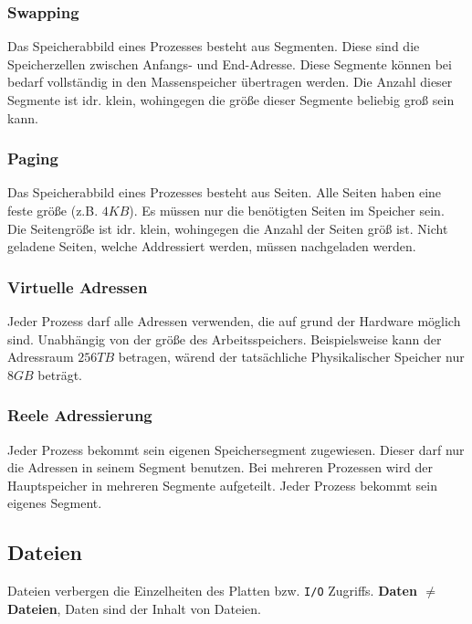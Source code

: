 \subsubsection{Swapping}

Das Speicherabbild eines Prozesses besteht aus Segmenten. Diese sind die
Speicherzellen zwischen Anfangs- und End-Adresse. Diese Segmente können bei
bedarf vollständig in den Massenspeicher übertragen werden. Die Anzahl dieser
Segmente ist idr. klein, wohingegen die größe dieser Segmente beliebig groß
sein kann.

\subsubsection{Paging}

Das Speicherabbild eines Prozesses besteht aus Seiten. Alle Seiten haben eine
feste größe (z.B. $4KB$). Es müssen nur die benötigten Seiten im Speicher sein.
Die Seitengröße ist idr. klein, wohingegen die Anzahl der Seiten größ ist.
Nicht geladene Seiten, welche Addressiert werden, müssen nachgeladen werden.

\subsubsection{Virtuelle Adressen}

Jeder Prozess darf alle Adressen verwenden, die auf grund der Hardware möglich
sind. Unabhängig von der größe des Arbeitsspeichers. Beispielsweise kann der
Adressraum $256TB$ betragen, wärend der tatsächliche Physikalischer Speicher
nur $8GB$ beträgt.

\subsubsection{Reele Adressierung}

Jeder Prozess bekommt sein eigenen Speichersegment zugewiesen. Dieser darf nur
die Adressen in seinem Segment benutzen. Bei mehreren Prozessen wird der
Hauptspeicher in mehreren Segmente aufgeteilt. Jeder Prozess bekommt sein
eigenes Segment.

\subsection{Dateien}

Dateien verbergen die Einzelheiten des Platten bzw. \texttt{I/O} Zugriffs.
\textbf{Daten $\neq$ Dateien}, Daten sind der Inhalt von Dateien.

